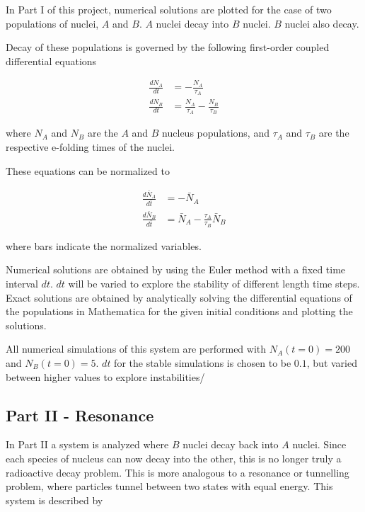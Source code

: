 \documentclass[pra,twocolumn,showpacs,amsmath,amssymb]{revtex4-1}
\begin{document}
In Part I of this project, numerical solutions are plotted for the case of two
populations of nuclei, $A$ and $B$. $A$ nuclei decay into $B$ nuclei. $B$
nuclei also decay.

Decay of these populations is governed by the following first-order coupled
differential equations

\begin{align}
  \frac{d N_A}{dt} &= -\frac{N_A}{\tau_A} \\
  \frac{d N_B}{dt} &= \frac{N_A}{\tau_A} - \frac{N_B}{\tau_B}
\end{align}

where $N_A$ and $N_B$ are the $A$ and $B$ nucleus populations, and $\tau_A$ and
$\tau_B$ are the respective e-folding times of the nuclei.

These equations can be normalized to

\begin{align}
  \frac{d \bar N_A}{d \bar t} &= - \bar N_A \label{eq:decay_A_norm}\\
  \frac{d \bar N_B}{d \bar t} &= \bar N_A - \frac{\tau_A}{\tau_B} \label{eq:decay_B_norm}\bar N_B
\end{align}

where bars indicate the normalized variables.

Numerical solutions are obtained by using the Euler method with a fixed time
interval $dt$. $dt$ will be varied to explore the stability of different length
time steps. Exact solutions are obtained by analytically solving the differential
equations of the populations in Mathematica for the given initial conditions
and plotting the solutions.

All numerical simulations of this system are performed with
$N_A (t=0) = 200$ and $N_B (t=0) = 5$. $dt$ for the stable simulations is chosen
to be $0.1$, but varied between higher values to explore instabilities/

\subsection{Part II - Resonance}

In Part II a system is analyzed where $B$ nuclei decay back into $A$ nuclei.
Since each species of nucleus can now decay into the other, this is no longer
truly a radioactive decay problem. This is more analogous to a resonance or
tunnelling problem, where particles tunnel between two states with equal energy.
This system is described by
\end{document}
